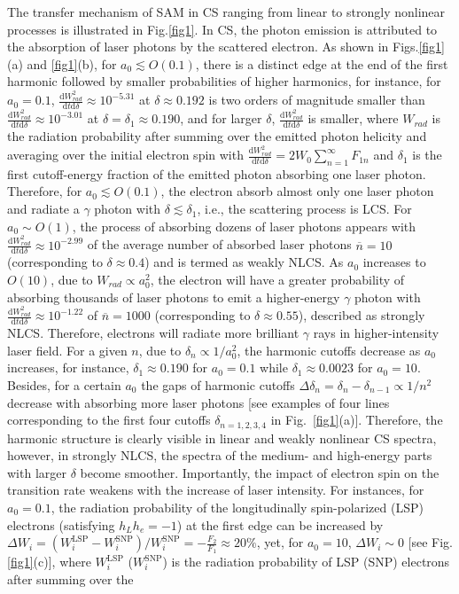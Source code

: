 \documentclass[10pt,twocolumn,showpacs,amsmath,amssymb,floatfix,superscriptaddress]{revtex4-2}
\begin{document}
The transfer mechanism of SAM in CS ranging from linear to strongly nonlinear processes is illustrated in Fig.\ref{fig1}. In CS, the photon emission is attributed to the absorption of laser photons by the scattered electron. As shown in Figs.\ref{fig1}(a) and \ref{fig1}(b), for $a_0 \lesssim O(0.1)$, there is a distinct edge at the end of the first harmonic followed by smaller probabilities of higher harmonics, for instance, for $a_0=0.1$, $\frac{\mathrm{d}W_{rad}^2}{\mathrm{d}t\mathrm{d}\delta} \approx 10^{-5.31}$ at $\delta \approx 0.192$ is two orders of magnitude smaller than  $\frac{\mathrm{d}W_{rad}^2}{\mathrm{d}t\mathrm{d}\delta} \approx 10^{-3.01}$ at $\delta =\delta_1 \approx 0.190$, and for larger $\delta$, $\frac{\mathrm{d}W_{rad}^2}{\mathrm{d}t\mathrm{d}\delta}$ is smaller, where $W_{rad}$ is the radiation probability after summing over the emitted photon helicity and  averaging over the initial electron spin with $\frac{\mathrm{d}W_{rad}^2}{\mathrm{d}t\mathrm{d}\delta} = 2W_0 \sum_{n=1}^{\infty} F_{1n}$ and $\delta_1$ is the first cutoff-energy fraction of the emitted photon absorbing one laser photon. Therefore, for $a_0 \lesssim O(0.1)$, the electron absorb almost only one laser photon and radiate a $\gamma$ photon with $\delta \lesssim \delta_1$, i.e., the scattering process is LCS. For $a_0 \sim O(1)$, the process of absorbing dozens of laser photons appears with $\frac{\mathrm{d}W_{rad}^2}{\mathrm{d}t\mathrm{d}\delta}\approx 10^{-2.99}$ of the average number of absorbed laser photons $\overline{n}=10$ (corresponding to $\delta \approx 0.4$) and is termed as weakly NLCS. As $a_0$ increases to $O(10)$, due to $W_{rad} \propto a_0^2$, the electron will have a greater probability of absorbing thousands of laser photons to emit a higher-energy $\gamma$ photon with $\frac{\mathrm{d}W_{rad}^2}{\mathrm{d}t\mathrm{d}\delta}\approx 10^{-1.22}$ of $\overline{n}=1000$ (corresponding to $\delta \approx 0.55$), described as strongly NLCS. Therefore, electrons will radiate more brilliant $\gamma$ rays in higher-intensity laser field. For a given $n$, due to $\delta_n \propto 1/a_0^2$, the harmonic cutoffs decrease as $a_0$ increases, for instance, $\delta_1 \approx 0.190$ for $a_0=0.1$ while $\delta_1 \approx 0.0023$ for $a_0=10$. Besides, for a certain $a_0$ the gaps of harmonic cutoffs $\Delta \delta_n = \delta_n-\delta_{n-1} \propto 1/n^2$ decrease with absorbing more laser photons [see examples of four lines corresponding to the first four cutoffs $\delta_{n=1,2,3,4}$ in Fig.~\ref{fig1}(a)]. Therefore, the harmonic structure is clearly visible in linear and weakly nonlinear CS spectra, however, in strongly NLCS, the spectra of the medium- and high-energy parts with larger $\delta$ become smoother. Importantly, the impact of electron spin on the transition rate weakens with the increase of laser intensity. For instances, for $a_0=0.1$, the radiation probability of the longitudinally spin-polarized (LSP) electrons (satisfying $h_L h_e=-1$) at the first edge can be increased by $\Delta W_i=(W_i^{\mathrm{LSP}}-W_i^{\mathrm{SNP}})/W_i^{\mathrm{SNP}} = -\frac{F_2}{F_1} \approx 20\%$, yet, for $a_0=10$, $\Delta W_i \sim 0$ [see Fig.\ref{fig1}(c)], where $W_i^{\mathrm{LSP}}$ ($W_i^{\mathrm{SNP}}$) is the radiation probability of LSP (SNP) electrons after summing over the 
\end{document}
